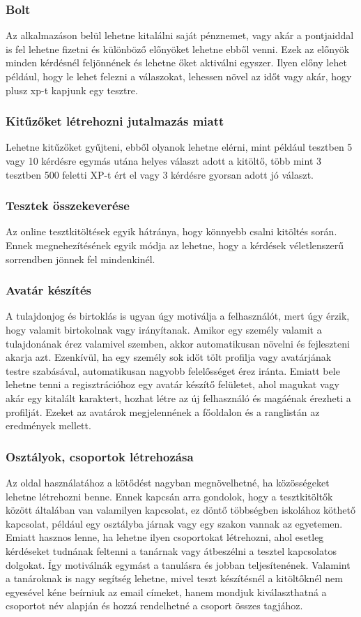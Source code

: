 \subsubsection{Bolt}
Az alkalmazáson belül lehetne kitalálni saját pénznemet, vagy akár a pontjaiddal is fel lehetne fizetni és különböző előnyöket lehetne ebből venni. Ezek az előnyök minden kérdésnél feljönnének és lehetne őket aktiválni egyszer. Ilyen előny lehet például, hogy le lehet felezni a válaszokat, lehessen növel az időt vagy akár, hogy plusz xp-t kapjunk egy tesztre.

\subsubsection{Kitűzőket létrehozni jutalmazás miatt}
Lehetne kitűzőket gyűjteni, ebből olyanok lehetne elérni, mint például tesztben 5 vagy 10 kérdésre egymás utána helyes választ adott a kitöltő, több mint 3 tesztben 500 feletti XP-t ért el vagy 3 kérdésre gyorsan adott jó választ.

\subsubsection{Tesztek összekeverése}
Az online tesztkitöltések egyik hátránya, hogy könnyebb csalni kitöltés során. Ennek megnehezítésének egyik módja az lehetne, hogy a kérdések véletlenszerű sorrendben jönnek fel mindenkinél.

\subsubsection{Avatár készítés}
A tulajdonjog és birtoklás is ugyan úgy motiválja a felhasználót, mert úgy érzik, hogy valamit birtokolnak vagy irányítanak. Amikor egy személy valamit a tulajdonának érez valamivel szemben, akkor automatikusan növelni és fejleszteni akarja azt. Ezenkívül, ha egy személy sok időt tölt profilja vagy avatárjának testre szabásával, automatikusan nagyobb felelősséget érez iránta. Emiatt bele lehetne tenni a regisztrációhoz egy avatár készítő felületet, ahol magukat vagy akár egy kitalált karaktert, hozhat létre az új felhasználó és magáénak érezheti a profilját. Ezeket az avatárok megjelennének a főoldalon és a ranglistán az eredmények mellett.

\subsubsection{Osztályok, csoportok létrehozása}
Az oldal használatához a kötődést nagyban megnövelhetné, ha közösségeket lehetne létrehozni benne. Ennek kapcsán arra gondolok, hogy a tesztkitöltők között általában van valamilyen kapcsolat, ez döntő többségben iskolához köthető kapcsolat, például egy osztályba járnak vagy egy szakon vannak az egyetemen. Emiatt hasznos lenne, ha lehetne ilyen csoportokat létrehozni, ahol esetleg kérdéseket tudnának feltenni a tanárnak vagy átbeszélni a tesztel kapcsolatos dolgokat. Így motiválnák egymást a tanulásra és jobban teljesítenének. Valamint a tanároknak is nagy segítség lehetne, mivel teszt készítésnél a kitöltőknél nem egyesével kéne beírniuk az email címeket, hanem mondjuk kiválaszthatná a csoportot név alapján és hozzá rendelhetné a csoport összes tagjához.


